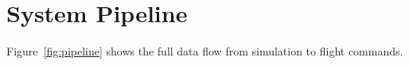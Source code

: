 \documentclass[11pt,a4paper]{article}
\begin{document}
\section{System Pipeline}
\label{sec:pipeline}

Figure~\ref{fig:pipeline} shows the full data flow from simulation to flight commands.

%
%
%
%
\end{document}
